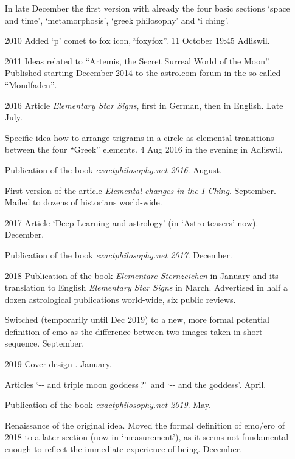 \begin{itemize}
In late December the first version with already the four basic sections
‘space and time’, ‘metamorphosis’, ‘greek philosophy’ and ‘i ching’.

\item[2010]
Added ‘p’ comet to fox icon,\,“foxyfox”. 11 October 19:45 Adliswil.

\item[2011]
Ideas related to “Artemis, the Secret Surreal World of the Moon”.
%
Published starting December 2014 to the astro.com forum in the so-called “Mondfaden”$\!$.

\item[2016]
Article \textsl{Elementary Star Signs}, first in German, then in English.
%
Late July.

Specific idea how to arrange trigrams in a circle
as elemental transitions between the four “Greek” elements.
%
4 Aug 2016 in the evening in Adliswil.

Publication of the book \textsl{exactphilosophy.net 2016}.
%
August.

First version of the article \textsl{Elemental changes in the I Ching}.
%
September.
%
Mailed to dozens of historians world-wide.

\item[2017]
Article ‘Deep Learning and astrology’ (in ‘Astro teasers’ now). December.

Publication of the book \textsl{exactphilosophy.net 2017}.
%
December.

\item[2018]
Publication of the book \textsl{Elementare Sternzeichen} in January
and its translation to English \textsl{Elementary Star Signs} in March.
%
Advertised in half a dozen astrological publications world-wide,
six public reviews.

{\color{darkgray}%
Switched (temporarily until Dec 2019)
to a new, more formal potential definition of emo
as the difference between two images taken in short sequence.
%
September.}

\item[2019]
Cover design {\ELEMENTAL}. January.

Articles
‘-- and triple moon goddess\,?’~and
‘-- and the\,\,goddess’.
%
April.

Publication of the book \textsl{exactphilosophy.net 2019}.
%
May.

Renaissance of the original idea.
{\color{darkgray}%
Moved the formal definition of emo/ero of 2018 to a later section (now in ‘measurement’),
as it seems not fundamental enough
to reflect the immediate experience of being.}
%
December.


\end{itemize}
